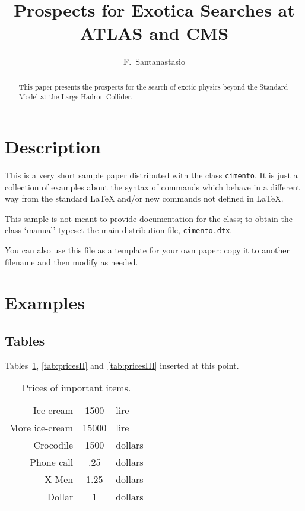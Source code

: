 \documentclass{cimento}
\title{Prospects for Exotica Searches at ATLAS and CMS}
\author{F.~Santanastasio\from{ins:UMD}\ETC
}
\begin{document}
\maketitle

\begin{abstract}
This paper presents the prospects for the search of exotic physics 
beyond the Standard Model at the Large Hadron Collider. 
\end{abstract}

\section{Description}
This is a very short sample paper distributed with the class
\texttt{cimento}.
It is just a collection of examples about the syntax of commands
which behave in a different way from the standard \LaTeX
and/or new commands not defined in \LaTeX.




This sample is not meant to provide documentation for the class;
to obtain the class `manual' typeset the main distribution file,
\texttt{cimento.dtx}.

You can also use this file as a template for your own paper:
copy it to another filename and then modify as needed.

\section{Examples}

\subsection{Tables}
Tables~\ref{tab:pricesI}, \ref{tab:pricesII} and~\ref{tab:pricesIII}
inserted at this point.

\begin{table}
  \caption{Prices of important items.}
  \label{tab:pricesI}
  \begin{tabular}{rcl}
    \hline
      Ice-cream      & 1500  & lire    \\
      More ice-cream & 15000 & lire    \\
      Crocodile      & 1500  & dollars \\
    \hline
      Phone call     & .25   & dollars \\
      X-Men          & 1.25  & dollars \\
      Dollar         & 1     & dollars \\
    \hline
  \end{tabular}
\end{table}
\end{document}
